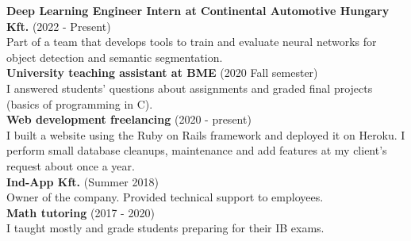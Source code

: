 \documentclass{article}
\begin{document}
\noindent
\textbf{Deep Learning Engineer Intern at Continental Automotive Hungary Kft.} \hspace{3mm} \color{gray} (2022 - Present) \color{black} \\
Part of a team that develops tools to train and evaluate neural networks for object detection and semantic segmentation.
\smallskip \\

\noindent
\textbf{University teaching assistant at BME} \hspace{3mm} \color{gray} (2020 Fall semester) \color{black} \\
I answered students' questions about assignments and graded final projects (basics of programming in C).
\smallskip \\

\noindent
\textbf{Web development freelancing} \hspace{3mm} \color{gray} (2020 - present) \color{black} \\
I built a website using the Ruby on Rails framework and deployed it on Heroku. I perform small database cleanups, maintenance and add features at my client's request about once a year.
\smallskip \\

\noindent
\textbf{Ind-App Kft.} \color{gray} (Summer 2018) \color{black} \\
Owner of the company. Provided technical support to employees.
\smallskip \\

\noindent
\textbf{Math tutoring} \hspace{3mm} \color{gray} (2017 - 2020) \color{black} \\
I taught mostly  and  grade students preparing for their IB exams.
\smallskip \\
\end{document}
